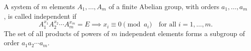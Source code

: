 A system of $m$ elements $A_1, \ldots, A_m$ of a finite Abelian group, with orders $a_1, \ldots, a_m$, is called independent if
$$A_1^{x_1} A_2^{x_2} \cdots A_m^{x_m} = E \implies x_i \equiv 0 \pmod{a_i} \quad \text{for all } i = 1, \ldots, m.$$
The set of all products of powers of $m$ independent elements forms a subgroup of order $a_1 a_2 \cdots a_m$.
